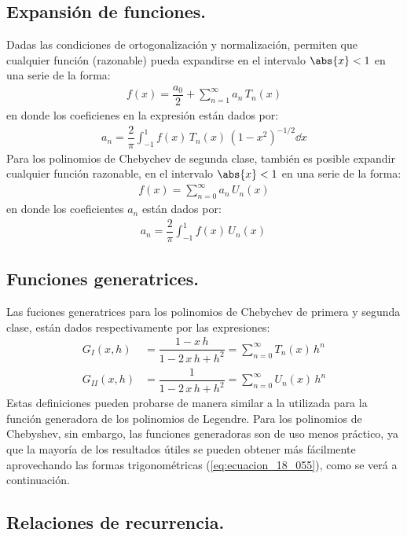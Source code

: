 \subsection{Expansión de funciones.}
Dadas las condiciones de ortogonalización y normalización, permiten que cualquier función (razonable) pueda expandirse en el intervalo $\abs{x} < 1$ en una serie de la forma:
\begin{align*}
f(x) = \dfrac{a_{0}}{2} + \sum_{n=1}^{\infty} a_{n} \, T_{n} (x)
\end{align*}
en donde los coeficienes en la expresión están dados por:
\begin{align*}
a_{n} = \dfrac{2}{\pi} \int_{-1}^{1} f(x) \, T_{n} (x) \, (1 - x^{2})^{-1/2} \dd{x}
\end{align*}
Para los polinomios de Chebychev de segunda clase, también es posible expandir cualquier función razonable, en el intervalo $\abs{x} < 1$ en una serie de la forma:
\begin{align*}
f(x) = \sum_{n=0}^{\infty} a_{n} \, U_{n} (x)
\end{align*}
en donde los coeficientes $a_{n}$ están dados por:
\begin{align*}
a_{n} = \dfrac{2}{\pi} \int_{-1}^{1} f(x) \, U_{n}(x) \, 
\end{align*}

\subsection{Funciones generatrices.}

Las fuciones generatrices para los polinomios de Chebychev de primera y segunda clase, están dados respectivamente por las expresiones:
\begin{align}
G_{I} (x, h) &= \dfrac{1 - x \, h}{1 - 2 \, x \, h + h^{2}} = \sum_{n=0}^{\infty} T_{n} (x) \, h^{n} \label{eq:ecuacion_18_063} \\[0.5em]
G_{II} (x, h) &= \dfrac{1}{1 - 2 \, x \, h + h^{2}} = \sum_{n=0}^{\infty} U_{n} (x) \, h^{n} \label{eq:ecuacion_18_064}
\end{align}
Estas definiciones pueden probarse de manera similar a la utilizada para la función generadora de los polinomios de Legendre. Para los polinomios de Chebyshev, sin embargo, las funciones generadoras son de uso menos práctico, ya que la mayoría de los resultados útiles se pueden obtener más fácilmente aprovechando las formas trigonométricas (\ref{eq:ecuacion_18_055}), como se verá a continuación.

\subsection{Relaciones de recurrencia.}

